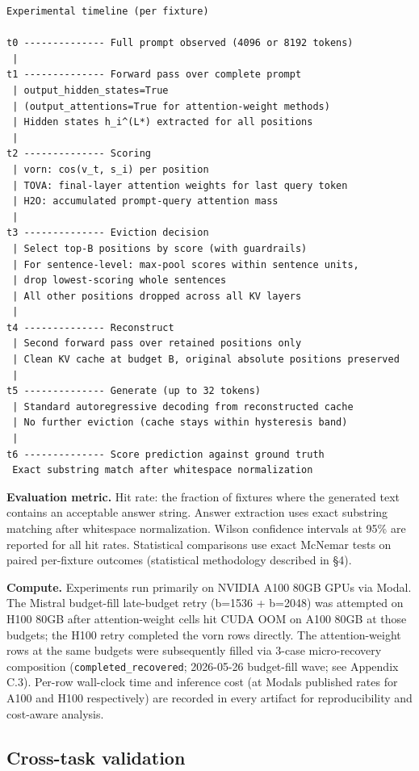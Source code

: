 \documentclass[10pt]{article}
\begin{document}
\begin{verbatim}
Experimental timeline (per fixture)

t0 -------------- Full prompt observed (4096 or 8192 tokens)
 |
t1 -------------- Forward pass over complete prompt
 | output_hidden_states=True
 | (output_attentions=True for attention-weight methods)
 | Hidden states h_i^(L*) extracted for all positions
 |
t2 -------------- Scoring
 | vorn: cos(v_t, s_i) per position
 | TOVA: final-layer attention weights for last query token
 | H2O: accumulated prompt-query attention mass
 |
t3 -------------- Eviction decision
 | Select top-B positions by score (with guardrails)
 | For sentence-level: max-pool scores within sentence units,
 | drop lowest-scoring whole sentences
 | All other positions dropped across all KV layers
 |
t4 -------------- Reconstruct
 | Second forward pass over retained positions only
 | Clean KV cache at budget B, original absolute positions preserved
 |
t5 -------------- Generate (up to 32 tokens)
 | Standard autoregressive decoding from reconstructed cache
 | No further eviction (cache stays within hysteresis band)
 |
t6 -------------- Score prediction against ground truth
 Exact substring match after whitespace normalization
\end{verbatim}

\textbf{Evaluation metric.} Hit rate: the fraction of fixtures where the
generated text contains an acceptable answer string. Answer extraction
uses exact substring matching after whitespace normalization. Wilson
confidence intervals at 95\% are reported for all hit rates. Statistical
comparisons use exact McNemar tests on paired per-fixture outcomes
(statistical methodology described in \S{}4).

\textbf{Compute.} Experiments run primarily on NVIDIA A100 80GB GPUs via
Modal. The Mistral budget-fill late-budget retry (b=1536 +
b=2048) was attempted on H100 80GB after attention-weight cells hit CUDA
OOM on A100 80GB at those budgets; the H100 retry completed the vorn
rows directly. The attention-weight rows at the same budgets were
subsequently filled via 3-case micro-recovery composition
(\texttt{completed\_recovered}; 2026-05-26 budget-fill wave;
see Appendix C.3). Per-row wall-clock
time and inference cost (at Modal\textquotesingle s published rates for
A100 and H100 respectively) are recorded in every artifact for
reproducibility and cost-aware analysis.

\subsection{Cross-task validation}\label{36-cross-task-validation}
\end{document}
